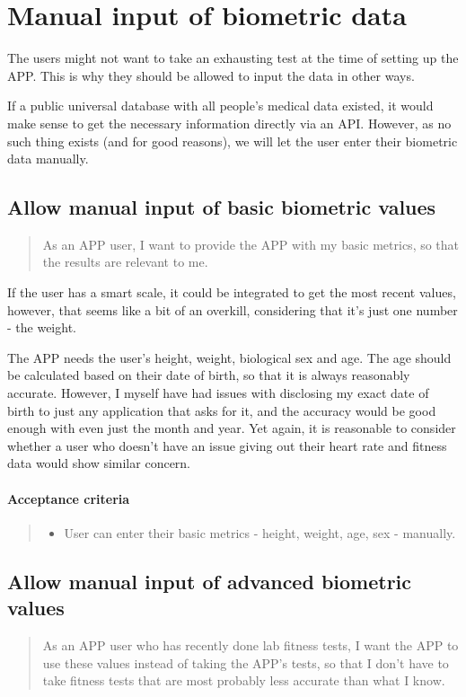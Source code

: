 \section{Manual input of biometric data}\label{epic:manual}

The users might not want to take an exhausting test at the time of setting up the APP.
This is why they should be allowed to input the data in other ways.

If a public universal database with all people's medical data existed, it would make sense to get the necessary information directly via an API.
However, as no such thing exists (and for good reasons), we will let the user enter their biometric data manually.

\subsection{Allow manual input of basic biometric values}\label{US:manual-basic}
\begin{quote}
As an APP user, I want to provide the APP with my basic metrics, so that the results are relevant to me.
\end{quote}

If the user has a smart scale, it could be integrated to get the most recent values, however, that seems like a bit of an overkill, considering that it's just one number - the weight.

The APP needs the user's height, weight, biological sex and age.
The age should be calculated based on their date of birth, so that it is always reasonably accurate.
However, I myself have had issues with disclosing my exact date of birth to just any application that asks for it, and the accuracy would be good enough with even just the month and year.
Yet again, it is reasonable to consider whether a user who doesn't have an issue giving out their heart rate and fitness data would show similar concern.

\paragraph*{Acceptance criteria}
\begin{quote}
\begin{itemize}
    \item User can enter their basic metrics - height, weight, age, sex - manually.
\end{itemize}
\end{quote}

\subsection{Allow manual input of advanced biometric values}\label{US:manual-advanced}
\begin{quote}
As an APP user who has recently done lab fitness tests, I want the APP to use these values instead of taking the APP's tests, so that I don't have to take fitness tests that are most probably less accurate than what I know.
\end{quote}

